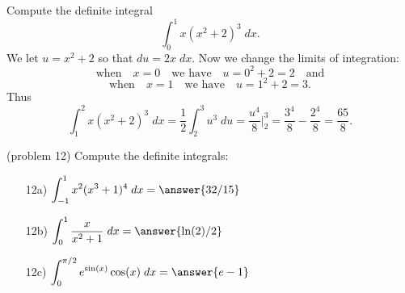 \documentclass[handout]{ximera}
\begin{document}
\begin{example}[example12]
Compute the definite integral 
\[
\int_0^1 x(x^2 + 2)^3 \; dx.
\]
We let $u = x^2 + 2$ so that $du = 2x \; dx$. Now we change the limits of integration: 
\[
\text{when} \quad x = 0 \quad \text{we have} \quad u = 0^2 + 2 = 2  \quad \text{and}
\]
\[ 
\text{when} \quad x = 1 \quad \text{we have} \quad u = 1^2 + 2 = 3.
\]
Thus
\[
\int_1^2 x(x^2 + 2)^3 \; dx = \frac12 \int_2^3 u^3 \; du = \frac{u^4}{8}\bigg|_2^3 = \frac{3^4}{8} - \frac{2^4}{8} = \frac{65}{8}.
\]
\end{example}

\begin{problem}(problem 12) Compute the definite integrals:
\begin{itemize}
\item[12a)] \; $\displaystyle{\int_{-1}^1 x^2(x^3 + 1)^4 \; dx = \answer{32/15}}$
\item[12b)] \; $\displaystyle{\int_0^1 \frac{x}{x^2 + 1}\; dx = \answer{\ln(2)/2}}$
\item[12c)] \; $\displaystyle{\int_0^{\pi/2} e^{\sin(x)} \cos(x) \; dx = \answer{e-1}}$
\end{itemize}
\end{problem}
\end{document}
